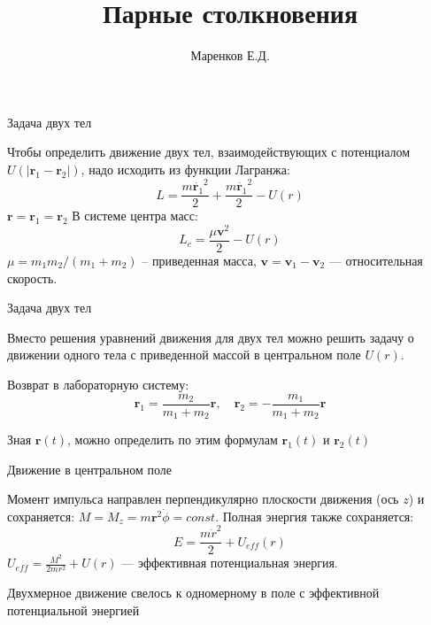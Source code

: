 \documentclass[14pt]{beamer}
\author{Маренков Е.Д.}
\title{Парные столкновения}
\begin{document}
\begin{frame}
\titlepage
\end{frame}


\begin{frame}{Задача двух тел}

Чтобы определить движение двух тел, взаимодействующих с потенциалом $U(|\bm{r}_1-\bm{r}_2|)$, надо исходить из функции Лагранжа:
\begin{equation}
L=\frac{m\dot{\bm{r}_1}^2}{2} + \frac{m\dot{\bm{r}_1}^2}{2}
-U(r)
\end{equation}
$\bm{r}=\bm{r}_1=\bm{r}_2$
В системе центра масс:
\begin{equation}
L_c=\frac{\mu \bm{v}^2}{2} - U(r)
\end{equation}
$\mu=m_1m_2/(m_1+m_2)$ -- приведенная масса, $\bm{v}=\bm{v}_1-\bm{v}_2$ --- относительная скорость.

\end{frame}

\begin{frame}{Задача двух тел}

\alert{Вместо решения уравнений движения для двух тел можно решить задачу о движении одного тела с приведенной массой в центральном поле $U(r)$. }

Возврат в лабораторную систему:
\begin{equation}
\bm{r}_1=\frac{m_2}{m_1+m_2}\bm{r}, \quad 
\bm{r}_2=-\frac{m_1}{m_1+m_2}\bm{r}
\end{equation}

Зная $\bm{r}(t)$, можно определить по этим формулам $\bm{r}_1(t)$ и $\bm{r}_2(t)$


\end{frame}

\begin{frame}{Движение в центральном поле}

Момент импульса направлен перпендикулярно плоскости движения (ось $z$) и сохраняется: $M=M_z=m\bm{r}^2\dot{\phi}=const$. Полная энергия также сохраняется:
\begin{equation}
E=\frac{m\dot{r}^2}{2} + U_{eff}(r)
\label{eq:E}
\end{equation}
$U_{eff}=\frac{M^2}{2mr^2}+U(r)$ --- эффективная потенциальная энергия. 


\alert{Двухмерное движение свелось к одномерному в поле с эффективной потенциальной энергией}

\end{frame}
\end{document}
